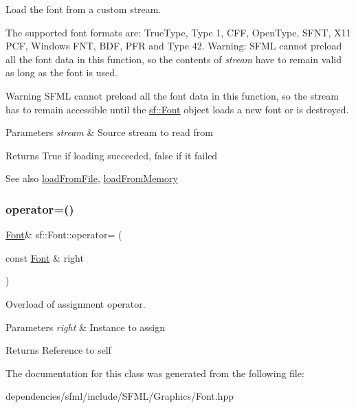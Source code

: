 Load the font from a custom stream. 

The supported font formats are\+: True\+Type, Type 1, C\+FF, Open\+Type, S\+F\+NT, X11 P\+CF, Windows F\+NT, B\+DF, P\+FR and Type 42. Warning\+: S\+F\+ML cannot preload all the font data in this function, so the contents of {\itshape stream} have to remain valid as long as the font is used.

\begin{DoxyWarning}{Warning}
S\+F\+ML cannot preload all the font data in this function, so the stream has to remain accessible until the \hyperlink{classsf_1_1_font}{sf\+::\+Font} object loads a new font or is destroyed.
\end{DoxyWarning}

\begin{DoxyParams}{Parameters}
{\em stream} & Source stream to read from\\
\hline
\end{DoxyParams}
\begin{DoxyReturn}{Returns}
True if loading succeeded, false if it failed
\end{DoxyReturn}
\begin{DoxySeeAlso}{See also}
\hyperlink{classsf_1_1_font_ab020052ef4e01f6c749a85571c0f3fd1}{load\+From\+File}, \hyperlink{classsf_1_1_font_abf2f8d6de31eb4e1db02e061c323e346}{load\+From\+Memory} 
\end{DoxySeeAlso}
\mbox{\label{classsf_1_1_font_a232515549846e3172a514d0b47918399}} 
\subsubsection{\texorpdfstring{operator=()}{operator=()}}
{\footnotesize\ttfamily \hyperlink{classsf_1_1_font}{Font}\& sf\+::\+Font\+::operator= (\begin{DoxyParamCaption}\item[{const \hyperlink{classsf_1_1_font}{Font} \&}]{right }\end{DoxyParamCaption})}



Overload of assignment operator. 


\begin{DoxyParams}{Parameters}
{\em right} & Instance to assign\\
\hline
\end{DoxyParams}
\begin{DoxyReturn}{Returns}
Reference to self 
\end{DoxyReturn}


The documentation for this class was generated from the following file\+:\begin{DoxyCompactItemize}
\item 
dependencies/sfml/include/\+S\+F\+M\+L/\+Graphics/Font.\+hpp\end{DoxyCompactItemize}
